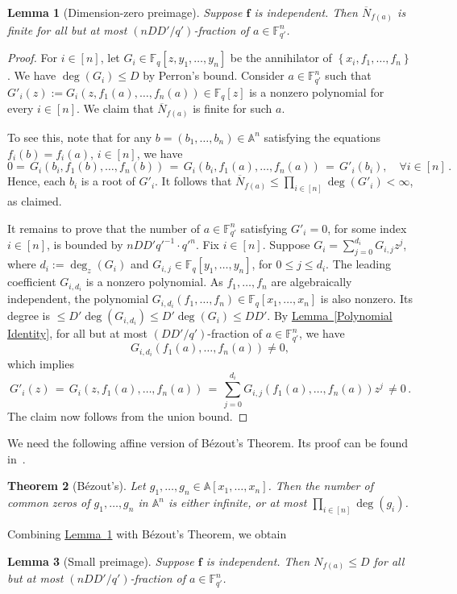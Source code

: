 \documentclass[11pt]{article}
\numberwithin{equation}{section}
\newtheorem{theorem}{Theorem}[section]
\newtheorem{lemma}[theorem]{Lemma}
\theoremstyle{definition}
\theoremstyle{plain}
\newcommand{\expref}[2]{\hyperref[#2]{#1~\ref{#2}}}
\newcommand{\F}{\mathbb{F}}
\newcommand{\aff}{\mathbb{A}}
\newcommand{\inbrace }[1]{\left\{#1\right\}}
\begin{document}
%
%
\begin{lemma}[Dimension-zero preimage]\label{lem_finite}
Suppose $\mathbf f$
%
is  %
independent. Then $\overline{N}_{f(a)}$ is \emph{finite} for all but at most $(nDD'/q')$-fraction of $a\in\F_{q'}^n$.
\end{lemma}
\begin{proof}
For $i\in [n]$, let $G_i\in\F_q[z, y_1,\dots,y_n]$ be the annihilator of $\inbrace{x_i, f_1,\dots,f_n}$. We have $\deg(G_i)\leq D$ by Perron's bound. 
Consider $a\in\F_{q'}^n$ such that  $G'_i(z):= G_i(z, f_1(a),\dots,f_n(a))\in\F_q[z]$ is a nonzero polynomial for every $i\in [n]$.
We claim that $\overline{N}_{f(a)}$ is finite for such $a$. 

To see this, note that for any $b=(b_1,\dots,b_n)\in \aff^n$ satisfying the equations $f_i(b)=f_i(a)$, $i\in[n]$, we have
\[
0=\, G_i(b_i, f_1(b), \dots, f_n(b)) \,=\, G_i(b_i, f_1(a),\dots, f_n(a)) \,=\, G'_i(b_i), \quad\forall i\in [n] \,.
\]
Hence, each $b_i$ is a root of $G'_i$. It follows that $\overline{N}_{f(a)} \leq \prod_{i\in[n]} \deg(G'_i) < \infty$, as claimed. 

It remains to prove  that the number of $a\in\F_{q'}^n$ satisfying $G'_i=0$, for some index $i\in [n]$, is bounded by $nDD'q'^{-1}\cdot q'^{n}$.
Fix $i\in [n]$. Suppose $G_i=\sum_{j=0}^{d_i} G_{i,j} z^j$, where $d_i:=\deg_z(G_i)$ and $G_{i,j}\in \F_q[y_1,\dots,y_n]$, for $0\leq j\leq d_i$.
The leading coefficient $G_{i,d_i}$ is a nonzero polynomial. As $f_1,\dots,f_n$ are algebraically independent, the polynomial $G_{i,d_i}(f_1,\dots,f_n)\in\F_q[x_1,\dots,x_n]$ is also nonzero.
Its degree is $\le D'\deg(G_{i,d_i}) \leq D'\deg(G_i) \leq DD'$.
By 
%
\expref{Lemma}{Polynomial Identity},  %
for all but at most $(DD'/q')$-fraction of $a\in \F_{q'}^n$, we have 
%
\[
G_{i,d_i}(f_1(a),\dots,f_n(a))\neq 0,
\]  %
which   implies  
\[
G'_i(z) \,=\, G_i(z, f_1(a),\dots,f_n(a)) \,=\, \sum_{j=0}^{d_i} G_{i,j}(f_1(a),\dots,f_n(a)) z^j \,\neq 0 \,.
\]
The claim now follows from the union bound.
\end{proof}

We need the following affine version of B\'ezout's Theorem. Its proof can be found in~\cite[Theorem~3.1]{Sch95}.
\begin{theorem}[B\'ezout's]
 Let $g_1,\dots,g_n\in \aff[x_1,\dots,x_n]$. Then the number of common zeros of $g_1,\dots,g_n$ in $\aff^n$ is either infinite, or at most $\prod_{i\in[n]} \deg(g_i)$.
\end{theorem}

Combining \expref{Lemma}{lem_finite} with B\'ezout's Theorem, we obtain
\begin{lemma}[Small preimage]\label{lem_bpre}
Suppose $\mathbf f$
%
is  %
independent.
Then $N_{f(a)}\leq D$ for all but at most $(nDD'/q')$-fraction of $a\in\F_{q'}^n$.
\end{lemma}
\end{document}
